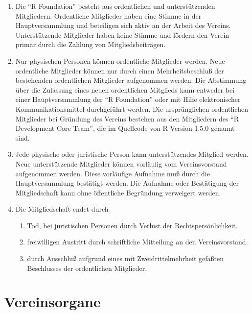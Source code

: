 \documentclass[a4paper]{article}
\newcommand{\RF}{"`R Foundation"'}
\begin{document}
\begin{enumerate}

 \item Die \RF{} besteht aus ordentlichen und unterst{\"u}tzenden
  Mitgliedern. Ordentliche Mitglieder haben eine Stimme in der
  Hauptversammlung und beteiligen sich aktiv an der Arbeit des
  Vereins. Unterst{\"u}tzende Mitglieder haben keine Stimme und f{\"o}rdern den
  Verein prim{\"a}r durch die Zahlung von Mitgliedsbeitr{\"a}gen.

 \item Nur physischen Personen k{\"o}nnen ordentliche Mitglieder
  werden. Neue ordentliche Mitglieder k{\"o}nnen nur durch einen
  Mehrheitsbeschlu{\ss} der bestehenden ordentlichen Mitglieder
  aufgenommen werden. Die Abstimmung {\"u}ber die Zulassung eines neuen
  ordentlichen Mitglieds kann entweder bei einer Hauptversammlung der
  \RF{} oder mit Hilfe elektronischer Kommunikationsmittel
  durchgef{\"u}hrt werden. Die urspr{\"u}nglichen ordentlichen Mitglieder bei
  Gr{\"u}ndung des Vereins bestehen aus den Mitgliedern des "`R
  Development Core Team"', die im Quellcode von R Version 1.5.0
  genannt sind.
  
 \item Jede physische oder juristische Person kann unterst{\"u}tzendes
  Mitglied werden. Neue unterst{\"u}tzende Mitglieder k{\"o}nnen vorl{\"a}ufig vom
  Vereinsvorstand aufgenommen werden. Diese vorl{\"a}ufige Aufnahme mu{\ss}
  durch die Hauptversammlung best{\"a}tigt werden. Die Aufnahme oder
  Best{\"a}tigung der Mitgliedschaft kann ohne {\"o}ffentliche Begr{\"u}ndung
  verweigert werden.
  
 \item Die Mitgliedschaft endet durch
  \begin{enumerate}
   \item Tod, bei juristischen Personen durch Verlust der
   Rechtspers{\"o}nlichkeit. 
   \item freiwilligen Austritt durch schriftliche Mitteilung an den
    Vereinsvorstand.
   \item durch Ausschlu{\ss} aufgrund eines mit Zweidrittelmehrheit
    gefa{\ss}ten Beschlusses der ordentlichen Mitglieder.
  \end{enumerate}
\end{enumerate}
   

\section{Vereinsorgane}
\end{document}
